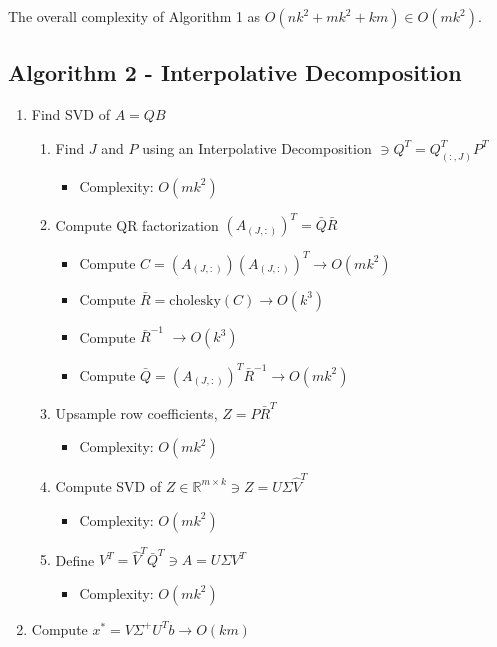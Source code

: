 \documentclass{article}[11pt]
\begin{document}
   The overall complexity of Algorithm 1 as $O(n k^2 + m k^2 + km) \in O(m k^2)$.
   
   \subsection{Algorithm 2 - Interpolative Decomposition}
   \begin{enumerate}
   \item Find SVD of $A = QB$
   		\begin{enumerate}
   		\item Find $J$ and $P$ using an Interpolative Decomposition $\ni Q^{T} = Q^{T}_{(:,J)}P^T$
   			\begin{itemize}
   			\item Complexity: $O(m k^2)$
   			\end{itemize}
   		\item Compute QR factorization $(A_{(J,:)})^T = \bar{Q}\bar{R}$
   			\begin{itemize}
   			\item Compute $C = (A_{(J,:)})(A_{(J,:)})^T \rightarrow O(mk^2)$
   			\item Compute $\bar{R} = \text{cholesky}(C) \rightarrow O(k^3)$
   			\item Compute $\bar{R}^{-1}$ $\rightarrow O(k^3)$
   			\item Compute $\bar{Q} = (A_{(J,:)})^T\bar{R}^{-1} \rightarrow O(mk^2)$
   			\end{itemize}
   		\item Upsample row coefficients, $Z = P\bar{R}^T$
   			\begin{itemize}
   			\item Complexity: $O(m k^2 )$
   			\end{itemize}
   		\item Compute SVD of $Z \in \mathbb{R}^{m \times k} \ni Z = U \Sigma \hat{V}^T$
   			\begin{itemize}
   			\item Complexity: $O(m k^2)$
   			\end{itemize}
   		\item Define $V^T = \hat{V}^T \bar{Q}^T \ni A = U \Sigma V^T$
   			\begin{itemize}
   			\item Complexity: $O(m k^2)$
   			\end{itemize}
   		\end{enumerate}
   \item Compute $x^* = V \Sigma^{+} U^T b \rightarrow O(km)$
   \end{enumerate}
   
\end{document}
